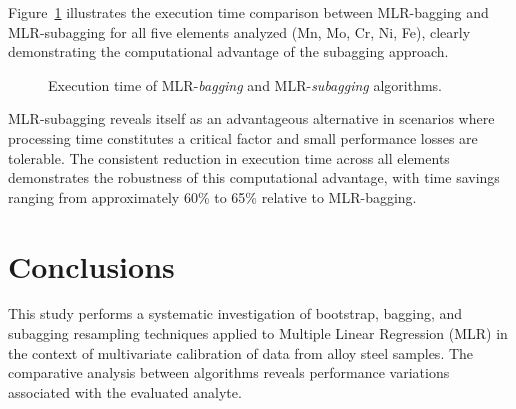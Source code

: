 \documentclass[12pt]{article}
\begin{document}
Figure~\ref{fig:tempo} illustrates the execution time comparison between MLR-bagging and MLR-subagging for all five elements analyzed (Mn, Mo, Cr, Ni, Fe), clearly demonstrating the computational advantage of the subagging approach.

\begin{figure}[htbp]
\centering
\caption{Execution time of MLR-\textit{bagging} and MLR-\textit{subagging} algorithms.}
\label{fig:tempo}
\end{figure}

MLR-subagging reveals itself as an advantageous alternative in scenarios where processing time constitutes a critical factor and small performance losses are tolerable. The consistent reduction in execution time across all elements demonstrates the robustness of this computational advantage, with time savings ranging from approximately 60\% to 65\% relative to MLR-bagging.

\section{Conclusions}

This study performs a systematic investigation of bootstrap, bagging, and subagging resampling techniques applied to Multiple Linear Regression (MLR) in the context of multivariate calibration of data from alloy steel samples. The comparative analysis between algorithms reveals performance variations associated with the evaluated analyte.
\end{document}
